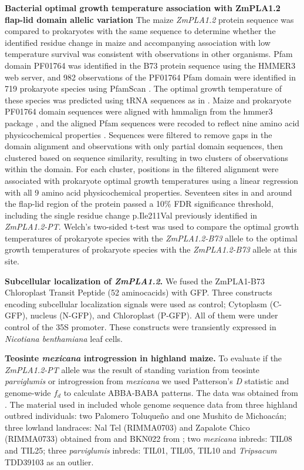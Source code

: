 \documentclass[9pt,twocolumn,twoside,lineno]{BioRxiv}
\begin{document}
\textbf{Bacterial optimal growth temperature association with ZmPLA1.2 flap-lid domain allelic variation}
The maize \textit{ZmPLA1.2} protein sequence was compared to prokaryotes with the same sequence to determine whether the identified residue change in maize and accompanying association with low temperature survival was consistent with observations in other organisms. 
Pfam domain PF01764 was identified in the B73 protein sequence using the HMMER3 web server, and 982 observations of the PF01764 Pfam domain were identified in 719 prokaryote species using PfamScan \cite{Potter2018-tk, El-Gebali2019-pw}. 
The optimal growth temperature of these species was predicted using tRNA sequences as in \cite{Cimen2020-dm}. 
Maize and prokaryote PF01764 domain sequences were aligned with hmmalign from the hmmer3 package \cite{Eddy2011-pd}, and the aligned Pfam sequences were recoded to reflect nine amino acid physicochemical properties \cite{Li2016-ut}. 
Sequences were filtered to remove gaps in the domain alignment and observations with only partial domain sequences, then clustered based on sequence similarity, resulting in two clusters of observations within the domain. 
For each cluster, positions in the filtered alignment were associated with prokaryote optimal growth temperatures using a linear regression with all 9 amino acid physicochemical properties. 
Seventeen sites in and around the flap-lid region of the protein passed a 10\% FDR significance threshold, including the single residue change p.Ile211Val previously identified in \textit{ZmPLA1.2-PT}. 
Welch’s two-sided t-test was used to compare the optimal growth temperatures of prokaryote species with the \textit{ZmPLA1.2-B73} allele to the optimal growth temperatures of prokaryote species with the \textit{ZmPLA1.2-B73} allele at this site.

\textbf{Subcellular localization of \textit{ZmPLA1.2}.}
We fused the ZmPLA1-B73 Chloroplast Transit Peptide (52 aminocacids) with GFP. %
Three constructs encoding subcellular localization signals were used as control; Cytoplasm (C-GFP), nucleus (N-GFP), and Chloroplast (P-GFP). 
All of them were under control of the 35S promoter. 
These constructs were transiently expressed in \textit{Nicotiana benthamiana} leaf cells.

\textbf{Teosinte \textit{mexicana} introgression in highland maize.}
To evaluate if the \textit{ZmPLA1.2-PT} allele was the result of standing variation from teosinte \textit{parviglumis} or introgression from \textit{mexicana} we used Patterson's \textit{D} statistic and genome-wide $f_{d}$ to calculate ABBA-BABA patterns. 
The data was obtained from \cite{Gonzalez-Segovia2019-jy}. 
The material used in \cite{Gonzalez-Segovia2019-jy} included whole genome sequence data from three highland outbred individuals: two Palomero Toluqueño and one Mushito de Michoacán; three lowland landraces: Nal Tel (RIMMA0703) and Zapalote Chico (RIMMA0733) obtained from \cite{Wang2017-bc} and  BKN022 from \cite{Bukowski2017-ng}; two \textit{mexicana} inbreds: TIL08 and TIL25; three \textit{parviglumis} inbreds: TIL01, TIL05, TIL10 and \textit{Tripsacum} TDD39103 \cite{Bukowski2017-ng} as an outlier. 
\end{document}
